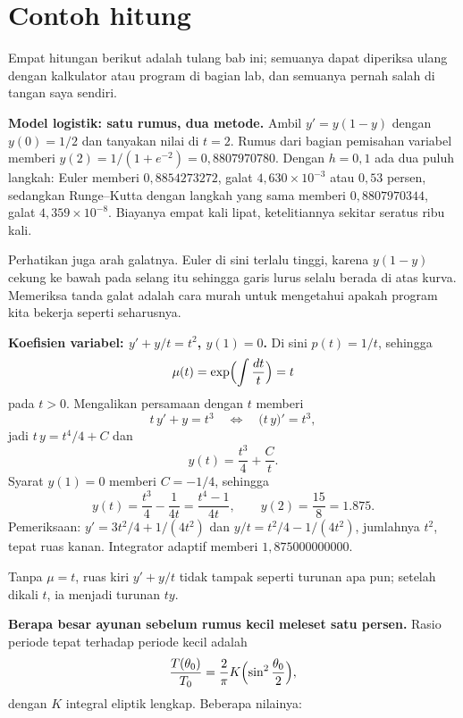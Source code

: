 \section{Contoh hitung}

Empat hitungan berikut adalah tulang bab ini; semuanya dapat diperiksa ulang
dengan kalkulator atau program di bagian lab, dan semuanya pernah salah di tangan
saya sendiri.

\textbf{Model logistik: satu rumus, dua metode.}
Ambil $y'=y(1-y)$ dengan $y(0)=1/2$ dan tanyakan nilai di $t=2$. Rumus dari
bagian pemisahan variabel memberi $y(2)=1/(1+e^{-2})=0{,}8807970780$. Dengan
$h=0{,}1$ ada dua puluh langkah: Euler memberi $0{,}8854273272$, galat
$4{,}630\times10^{-3}$ atau $0{,}53$ persen, sedangkan Runge--Kutta dengan langkah
yang sama memberi $0{,}8807970344$, galat $4{,}359\times10^{-8}$. Biayanya empat kali
lipat, ketelitiannya sekitar seratus ribu kali.

Perhatikan juga arah galatnya. Euler di sini terlalu tinggi, karena
$y(1-y)$ cekung ke bawah pada selang itu sehingga garis lurus selalu berada di
atas kurva. Memeriksa tanda galat adalah cara murah untuk mengetahui apakah program kita
bekerja seperti seharusnya.

\textbf{Koefisien variabel: $y'+y/t=t^{2}$, $y(1)=0$.}
Di sini $p(t)=1/t$, sehingga
\[
\mu(t)=\exp\Bigl(\int\frac{dt}{t}\Bigr)=t
\]
pada $t>0$. Mengalikan persamaan dengan $t$ memberi
\[
t\,y'+y=t^{3}
\quad\Longleftrightarrow\quad
\bigl(t\,y\bigr)'=t^{3},
\]
jadi $t\,y=t^{4}/4+C$ dan
\[
y(t)=\frac{t^{3}}{4}+\frac{C}{t}.
\]
Syarat $y(1)=0$ memberi $C=-1/4$, sehingga
\[
y(t)=\frac{t^{3}}{4}-\frac{1}{4t}=\frac{t^{4}-1}{4t},
\qquad y(2)=\frac{15}{8}=1.875 .
\]
Pemeriksaan: $y'=3t^{2}/4+1/(4t^{2})$ dan $y/t=t^{2}/4-1/(4t^{2})$, jumlahnya
$t^{2}$, tepat ruas kanan. Integrator adaptif memberi $1{,}875000000000$.

Tanpa $\mu=t$, ruas kiri $y'+y/t$ tidak tampak seperti turunan apa pun; setelah
dikali $t$, ia menjadi turunan $ty$.

\textbf{Berapa besar ayunan sebelum rumus kecil meleset satu persen.}
Rasio periode tepat terhadap periode kecil adalah
\[
\frac{T(\theta_{0})}{T_{0}}
=\frac{2}{\pi}K\Bigl(\sin^{2}\frac{\theta_{0}}{2}\Bigr),
\]
dengan $K$ integral eliptik lengkap. Beberapa nilainya:

